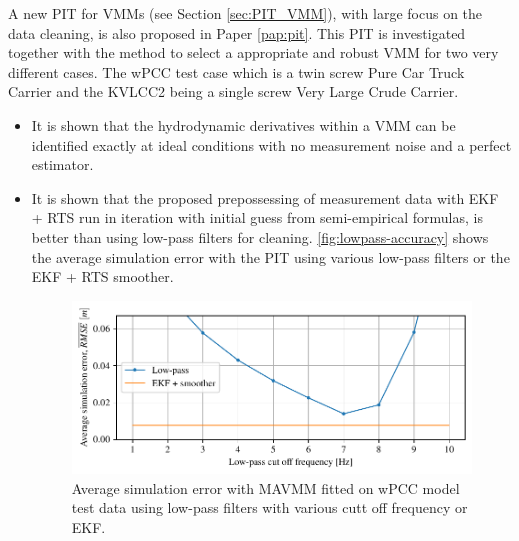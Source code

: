 \noindent A new PIT for VMMs (see Section \ref{sec:PIT_VMM}), with large focus on the data cleaning, is also proposed in Paper \ref{pap:pit}. This PIT is investigated together with the method to select a appropriate and robust VMM for two very different cases. The wPCC test case which is a twin screw Pure Car Truck Carrier and the KVLCC2 being a single screw Very Large Crude Carrier.    
\begin{itemize}
    
    \item It is shown that the hydrodynamic derivatives within a VMM can be identified exactly at ideal conditions with no measurement noise and a perfect estimator.
    
    \item It is shown that the proposed prepossessing of measurement data with EKF + RTS run in iteration with initial guess from semi-empirical formulas, is better than using low-pass filters for cleaning. \autoref{fig:lowpass-accuracy} shows the average simulation error with the PIT using various low-pass filters or the EKF + RTS smoother.
    \begin{figure}[h]
        \centering
        \includegraphics{kappa/images/6.pdf}
        \caption{Average simulation error with MAVMM fitted on wPCC model test data using low-pass filters with various cutt off frequency or EKF.}
        \label{fig:lowpass-accuracy}
    \end{figure}
    

\end{itemize}
